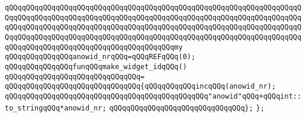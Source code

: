 \newline
\verb|qQQqqQQqqQQqqQQqqQQqqQQqqQQqqQQqqQQqqQQqqQQqqQQqqQQqqQQqqQQqqQQqqQQqqQQqqQQqqQQqqQQqqQQqqQQqqQQqqQQqqQQqqQQqqQQqqQQqqQQqqQQqqQQqqQQqqQQqqQQqqQQqqQQqqQQqqQQqqQQqqQQqqQQqqQQqqQQqqQQqqQQqqQQqqQQqqQQqqQQqqQQqqQQqqQQqqQQqqQQqqQQqqQQqqQQqqQQqqQQqqQQqqQQqqQQqqQQqqQQqqQQqqQQqqQQqqQQqqQQqqQQqqQQqqQQqqQQqqQQqqQQqqQQqqQQqqQQqqQQqmy|\newline
\verb|qQQqqQQqqQQqqQQqanowid_nrqQQq=qQQqREFqQQq(0);|\newline
\newline
\verb|qQQqqQQqqQQqqQQqfunqQQqmake_widget_idqQQq()|\newline
\verb|qQQqqQQqqQQqqQQqqQQqqQQqqQQqqQQq=|\newline
\verb|qQQqqQQqqQQqqQQqqQQqqQQqqQQqqQQq{qQQqqQQqqQQqincqQQq(anowid_nr);|\newline
\verb|qQQqqQQqqQQqqQQqqQQqqQQqqQQqqQQqqQQqqQQqqQQqqQQq"anowid"qQQq+qQQqint::to_stringqQQq*anowid_nr;|\newline
\verb|qQQqqQQqqQQqqQQqqQQqqQQqqQQqqQQq};|\newline
\newline
\verb|};|\newline
\newline
\newline
\newline
\newline
\newline
\newline

